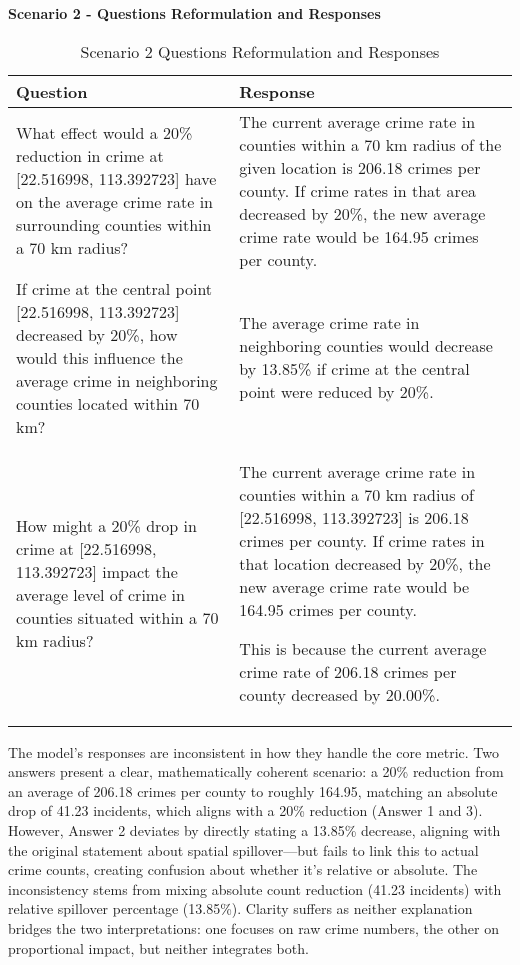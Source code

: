 \noindent \textbf{Scenario 2 - Questions Reformulation and Responses}
\begin{table}[hbtp]
\centering
\small
\begin{tabular}{|p{}|p{}|}
\hline
\textbf{Question} & \textbf{Response} \\
\hline
What effect would a 20\% reduction in crime at [22.516998, 113.392723] have on the average crime rate in surrounding counties within a 70 km radius? & The current average crime rate in counties within a 70 km radius of the given location is 206.18 crimes per county. If crime rates in that area decreased by 20\%, the new average crime rate would be 164.95 crimes per county. \\
\hline
If crime at the central point [22.516998, 113.392723] decreased by 20\%, how would this influence the average crime in neighboring counties located within 70 km? & The average crime rate in neighboring counties would decrease by 13.85\% if crime at the central point were reduced by 20\%. \\
\hline
How might a 20\% drop in crime at [22.516998, 113.392723] impact the average level of crime in counties situated within a 70 km radius? & 
The current average crime rate in counties within a 70 km radius of [22.516998, 113.392723] is 206.18 crimes per county. If crime rates in that location decreased by 20\%, the new average crime rate would be 164.95 crimes per county. 

This is because the current average crime rate of 206.18 crimes per county decreased by 20.00\%. \\
\hline
\end{tabular}
\caption{Scenario 2 Questions Reformulation and Responses}
\label{tab:questions_responses_2}
\end{table}

The model's responses are inconsistent in how they handle the core metric. Two answers present a clear, mathematically coherent scenario: a 20\% reduction from an average of 206.18 crimes per county to roughly 164.95, matching an absolute drop of 41.23 incidents, which aligns with a 20\% reduction (Answer 1 and 3). However, Answer 2 deviates by directly stating a 13.85\% decrease, aligning with the original statement about spatial spillover—but fails to link this to actual crime counts, creating confusion about whether it's relative or absolute. The inconsistency stems from mixing absolute count reduction (41.23 incidents) with relative spillover percentage (13.85\%). Clarity suffers as neither explanation bridges the two interpretations: one focuses on raw crime numbers, the other on proportional impact, but neither integrates both.


